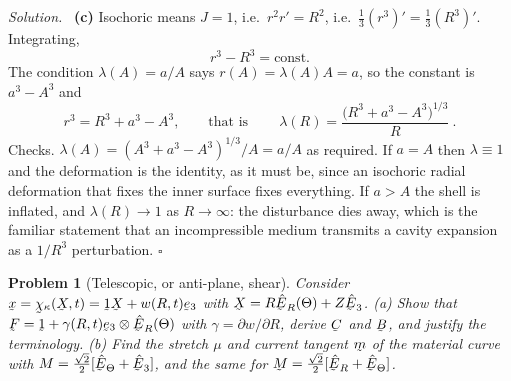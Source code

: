 \documentclass[17pt,a4paper]{extreport}
\DeclareRobustCommand{\vek}[1]{\underaccent{\tilde}{#1}}
\renewcommand{\bm}{\vek{m}}
\newcommand{\bx}{\vek{x}}
\newcommand{\bM}{\vek{M}}
\newcommand{\bX}{\vek{X}}
\newcommand{\bB}{\vek{B}}
\newcommand{\bC}{\vek{C}}
\newcommand{\bF}{\vek{F}}
\newcommand{\be}{\vek{e}}
\newcommand{\hbE}{\hat{\vek{E}}}
\newcommand{\bchi}{\vek{\chi}}
\newcommand{\shift}{\vek{1}}
\newcommand{\hER}{\hat{\vek{E}}_{R}}
\newcommand{\hETh}{\hat{\vek{E}}_{\Theta}}
\theoremstyle{scplain}
\theoremstyle{scdefn}
\newtheorem{problem}{Problem}
\newenvironment{solution}{\par\smallskip\noindent\textit{Solution.}\ }
  {\hfill$\square$\par\smallskip}
\begin{document}
\begin{solution}
\textbf{(c)} Isochoric means $J=1$, i.e.\ $r^{2}r'=R^{2}$, i.e.\
$\tfrac13(r^{3})'=\tfrac13(R^{3})'$. Integrating,
\[
   r^{3}-R^{3}=\text{const}.
\]
The condition $\lambda(A)=a/A$ says $r(A)=\lambda(A)A=a$, so the constant
is $a^{3}-A^{3}$ and
\[
   r^{3}=R^{3}+a^{3}-A^{3},
   \qquad\text{that is}\qquad
   \boxed{\ \lambda(R)=\frac{\big(R^{3}+a^{3}-A^{3}\big)^{1/3}}{R}\ }.
\]
Checks. $\lambda(A)=(A^{3}+a^{3}-A^{3})^{1/3}/A=a/A$ as required. If
$a=A$ then $\lambda\equiv1$ and the deformation is the identity, as it
must be, since an isochoric radial deformation that fixes the inner
surface fixes everything. If $a>A$ the shell is inflated, and
$\lambda(R)\to1$ as $R\to\infty$: the disturbance dies away, which is the
familiar statement that an incompressible medium transmits a cavity
expansion as a $1/R^{3}$ perturbation.
\end{solution}

\begin{problem}[Telescopic, or anti-plane, shear]
Consider $\bx=\bchi_{\kappa}(\bX,t)=\shift\bX+w(R,t)\be_{3}$ with
$\bX=R\hER(\Theta)+Z\hbE_{3}$.
(a) Show that $\bF=\shift+\gamma(R,t)\be_{3}\otimes\hER(\Theta)$ with
$\gamma=\partial w/\partial R$, derive $\bC$ and $\bB$, and justify the
terminology.
(b) Find the stretch $\mu$ and current tangent $\bm$ of the material curve
with $M=\tfrac{\sqrt2}{2}[\hETh+\hbE_{3}]$, and the same for
$\bM=\tfrac{\sqrt2}{2}[\hER+\hETh]$.
\end{problem}
\end{document}
